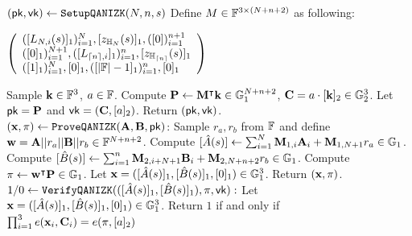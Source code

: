 \def\hp{\hspace*{0.1in}}
\begin{small}
\begin{algorithm}[bt]
$ (\mathsf{pk},\mathsf{vk}) \leftarrow \texttt{SetupQANIZK}(N,n,s)$
\newline
Define $M \in \mathbb{F}^{3\times(N+n+2)}$ as following: \newline
\begin{small}
$\left(
  \begin{array}{l}
    ({[}L_{N,i}(s)]_1)_{i=1}^N, [z_{\mathbb{H}_{N}}(s)]_1, ([0])_{i=1}^{n+1}\ \\ 
    ({[}0]_1)_{i=1}^{N+1}, ([L_{{\lceil{n}\rceil},i}]_1)_{i=1}^n, [z_{\mathbb{H}_{{\lceil{n}\rceil}}}(s)]_1 \\ 
	({[}1]_1)_{i=1}^{N}, [0]_1, ([|\mathbb{F}|-1]_1)_{i=1}^{n}, [0]_1
  \end{array}
\right)$
\end{small}
\newline
Sample ${{\mathbf {k}}} \in \mathbb{F}^3$, $a \in \mathbb{F}$.\newline
Compute ${{\mathbf {P}}} \leftarrow {{\mathbf {M}}}^\intercal {{\mathbf {k}}}
\in {\mathbb{G}}_1^{N+n+2}$,
${{\mathbf {C}}} = a \cdot [{{\mathbf {k}}}]_2 \in {\mathbb{G}}_2^3$.  \newline
Let $\mathsf{pk} = {{\mathbf {P}}}$ and $\mathsf{vk}=({{\mathbf {C}}}, [a]_2)$.
Return $(\mathsf{pk},\mathsf{vk})$.
\\
$({{\mathbf {x}}},\pi) \leftarrow 
	\texttt{ProveQANIZK}({{\mathbf {A}}},{{\mathbf {B}}}, \mathsf{pk})$:  \newline
	Sample $r_a, r_b$ from $\mathbb{F}$ and 
	define ${{\mathbf {w}}} = {{\mathbf {A}}} || r_a || {{\mathbf {B}}} || r_b \in \mathbb{F}^{N+n+2}$. 
	\newline
	Compute $[\hat{A}(s)] \leftarrow \sum_{i=1}^{N} {{\mathbf {M}}}_{1,i} {{\mathbf {A}}}_i
		+ {{\mathbf {M}}}_{1,N+1} r_a \in {\mathbb{G}}_1$. \newline
	Compute $[\hat{B}(s)] \leftarrow \sum_{i=1}^{n} {{\mathbf {M}}}_{2,i+N+1} 
		{{\mathbf {B}}}_i
		+ {{\mathbf {M}}}_{2,N+n+2} r_b \in {\mathbb{G}}_1$. \newline
	Compute $\pi \leftarrow {{\mathbf {w}}}^\intercal {{\mathbf {P}}} \in {\mathbb{G}}_1$.\newline
	Let ${{\mathbf {x}}} = ([\hat{A}(s)]_1, [\hat{B}(s)]_1, [0]_1) \in {\mathbb{G}}_1^3$. \newline
	Return $({{\mathbf {x}}}, \pi)$.
\\
$1/0 \leftarrow \texttt{VerifyQANIZK}(([\hat{A}(s)]_1,[\hat{B}(s)]_1),
	\pi,\mathsf{vk}):$ \newline
	Let ${{\mathbf {x}}} = ([\hat{A}(s)]_1, [\hat{B}(s)]_1, [0]_1) \in {\mathbb{G}}_1^3$. \newline
	Return $1$ if and only if
	$
		\prod_{i=1}^{3} e({{\mathbf {x}}}_i, {{\mathbf {C}}}_i)
		= e(\pi, [a]_2)
	$

\caption{QA-NIZK for 
$\sum_{i=1}^N \myvec{A}_i = \sum_{i=1}^n \myvec{B}_i$.}
\label{fig_qa}
\end{algorithm}
\end{small}

